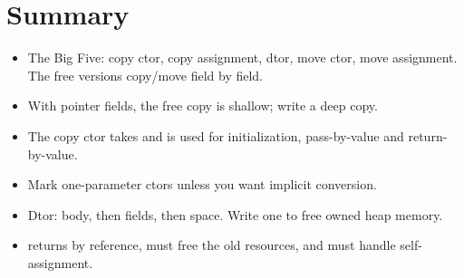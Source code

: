 \section*{Summary}
\begin{itemize}
  \item The Big Five: copy ctor, copy assignment, dtor, move ctor, move
        assignment. The free versions copy/move field by field.
  \item With pointer fields, the free copy is shallow; write a deep copy.
  \item The copy ctor takes  and is used for initialization,
        pass-by-value and return-by-value.
  \item Mark one-parameter ctors  unless you want implicit
        conversion.
  \item Dtor: body, then fields, then space. Write one to free owned heap memory.
  \item {} returns  by reference, must free the old
        resources, and must handle self-assignment.
\end{itemize}
